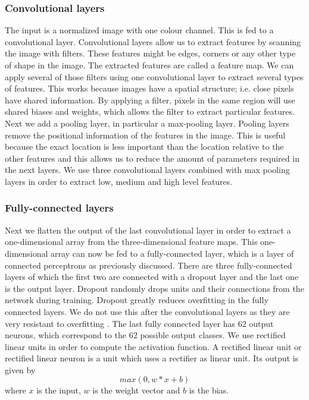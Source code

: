 \documentclass{article}
\begin{document}
\subsubsection{Convolutional layers}
 The input is a normalized image with one colour channel. This is fed to a convolutional layer. Convolutional layers allow us to extract features by scanning the image with filters. These features might be edges, corners or any other type of shape in the image. The extracted features are called a feature map.
 We can apply several of those filters using one convolutional layer to extract several types of features.
 This works because images have a spatial structure; i.e. close pixels have shared information. By applying a filter, pixels in the same region will use shared biases and weights, which allows the filter to extract particular features.
 Next we add a pooling layer, in particular a max-pooling layer. Pooling layers remove the positional information of the features in the image. This is useful because the exact location is less important than the location relative to the other features and this allows us to reduce the amount of parameters required in the next layers.
We use three convolutional layers combined with max pooling layers in order to extract low, medium and high level features.
\subsubsection{Fully-connected layers}
Next we flatten the output of the last convolutional layer in order to extract a one-dimensional array from the three-dimensional feature maps. This one-dimensional array can now be fed to a fully-connected layer, which is a layer of connected perceptrons as previously discussed.
There are three fully-connected layers of which the first two are connected with a dropout layer and the last one is the output layer.
Dropout randomly drops units and their connections from the network during training. Dropout greatly reduces overfitting in the fully connected layers. \cite{dropout} We do not use this after the convolutional layers as they are very resistant to overfitting \cite{nnbook}.
The last fully connected layer has 62 output neurons, which correspond to the 62 possible output classes. We use rectified linear units in order to compute the activation function. A rectified linear unit or rectified linear neuron is a unit which uses a rectifier as linear unit. Its output is given by
\begin{equation}
        max(0, w*x+b)
\end{equation}
where $x$ is the input, $w$ is the weight vector and $b$ is the bias.
\end{document}
